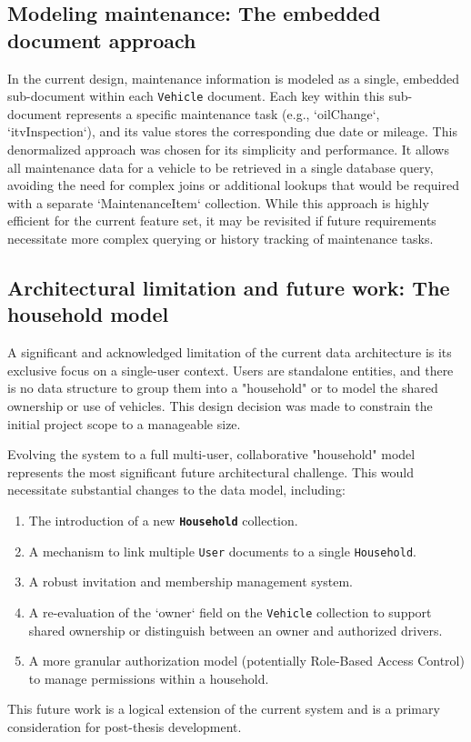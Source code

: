 
\subsection{Modeling maintenance: The embedded document approach}
In the current design, maintenance information is modeled as a single, embedded sub-document within each \texttt{Vehicle} document. Each key within this sub-document represents a specific maintenance task (e.g., `oilChange`, `itvInspection`), and its value stores the corresponding due date or mileage. This denormalized approach was chosen for its simplicity and performance. It allows all maintenance data for a vehicle to be retrieved in a single database query, avoiding the need for complex joins or additional lookups that would be required with a separate `MaintenanceItem` collection. While this approach is highly efficient for the current feature set, it may be revisited if future requirements necessitate more complex querying or history tracking of maintenance tasks.

\subsection{Architectural limitation and future work: The household model}
A significant and acknowledged limitation of the current data architecture is its exclusive focus on a single-user context. Users are standalone entities, and there is no data structure to group them into a "household" or to model the shared ownership or use of vehicles. This design decision was made to constrain the initial project scope to a manageable size.

\textgap

Evolving the system to a full multi-user, collaborative "household" model represents the most significant future architectural challenge. This would necessitate substantial changes to the data model, including:
\begin{enumerate}
    \item The introduction of a new \textbf{\texttt{Household}} collection.
    \item A mechanism to link multiple \texttt{User} documents to a single \texttt{Household}.
    \item A robust invitation and membership management system.
    \item A re-evaluation of the `owner` field on the \texttt{Vehicle} collection to support shared ownership or distinguish between an owner and authorized drivers.
    \item A more granular authorization model (potentially Role-Based Access Control) to manage permissions within a household.
\end{enumerate}
This future work is a logical extension of the current system and is a primary consideration for post-thesis development.

